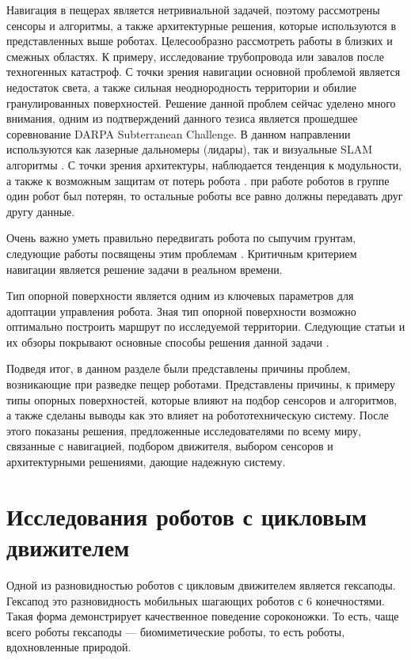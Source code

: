 Навигация в пещерах является нетривиальной задачей, поэтому рассмотрены сенсоры и алгоритмы, а также архитектурные решения, которые используются в представленных выше роботах. Целесообразно рассмотреть работы в близких и смежных областях. К примеру, исследование трубопровода \cite{Savin2017} или завалов после техногенных катастроф. С точки зрения навигации основной проблемой является недостаток света, а также сильная неоднородность территории и обилие гранулированных поверхностей. Решение данной проблем сейчас уделено много внимания, одним из подтверждений данного тезиса является прошедшее соревнование DARPA Subterranean Challenge. В данном направлении используются как лазерные дальномеры (лидары), так и визуальные SLAM алгоритмы \cite{Mascarich2018a,Dang2019a,Fairfield2006,Chhaniyara2012}. С точки зрения архитектуры, наблюдается тенденция к модульности, а также к возможным защитам от потерь робота \cite{Miller2019,weiStudyMineRescue2009}. при работе роботов в группе один робот был потерян, то остальные роботы все равно должны передавать друг другу данные. 

Очень важно уметь правильно передвигать робота по сыпучим грунтам, следующие работы посвящены этим проблемам \cite{Tan2016,Savin2017,Chhaniyara2012,Tsounis2019, Li2009,Bjelonic2019,DeViragh2019,Buchanan2019}. Критичным критерием навигации является решение задачи в реальном времени.

Тип опорной поверхности является одним из ключевых параметров для адоптации управления робота. Зная тип опорной поверхности возможно оптимально построить маршрут по исследуемой территории. Следующие статьи и их обзоры покрывают основные способы решения данной задачи \cite{wuIntegratedGroundReaction2016,wuTactileSensingTerrainBased2020,luo_robotic_2017}.

Подведя итог, в данном разделе были представлены причины проблем, возникающие при разведке пещер роботами. Представлены причины, к примеру типы опорных поверхностей, которые влияют на подбор сенсоров и алгоритмов, а также сделаны выводы как это влияет на робототехническую систему. После этого показаны решения, предложенные исследователями по всему миру, связанные с навигацией, подбором движителя, выбором сенсоров и архитектурными решениями, дающие надежную систему. 

\section{Исследования роботов с цикловым движителем}
Одной из разновидностью роботов с цикловым движителем является гексаподы. Гексапод это разновидность мобильных шагающих роботов с 6 конечностями. Такая форма демонстрирует качественное поведение сороконожки. То есть, чаще всего роботы гексаподы --- биомиметические роботы, то есть роботы, вдохновленные природой.

